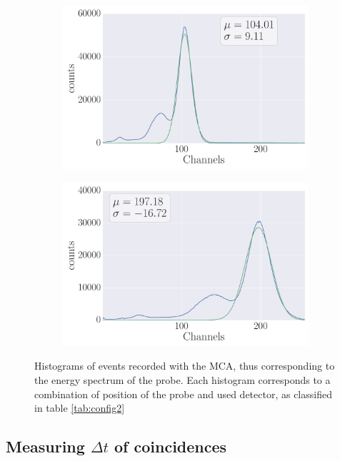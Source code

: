 \begin{figure}
\begin{subfigure}[b]{\picwidth}
        \caption{}
    \end{subfigure}
    \begin{subfigure}[b]{\picwidth}
        \includegraphics[width=\textwidth]{analysis/figures/plot2_1d}
        \caption{}
    \end{subfigure}
    \begin{subfigure}[b]{\picwidth}
        \includegraphics[width=\textwidth]{analysis/figures/plot2_1e}
        \caption{}
    \end{subfigure}
    \caption{
        Histograms of events recorded with the MCA, thus corresponding to the energy 
        spectrum of the probe. Each histogram corresponds to a combination of position 
        of the probe and used detector, as classified in table \ref{tab:config2}
        }
    \label{fig:measure2.1}
\end{figure}
\clearpage
\subsection{Measuring $\Delta t$ of coincidences}

